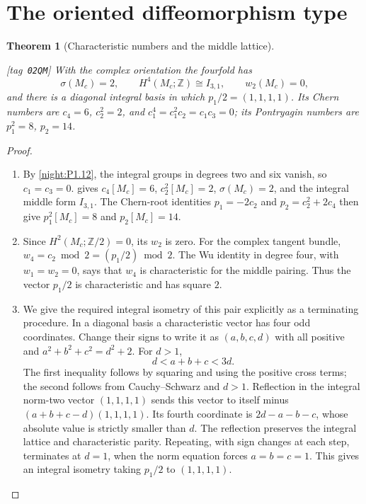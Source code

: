 \documentclass[11pt,a4paper]{article}
\numberwithin{equation}{section}
\newtheorem{theorem}{Theorem}[section]
\theoremstyle{definition}
\newcommand{\StatementRecord}[4]{{\upshape\footnotesize[tag~\texttt{#3}]}\enspace\ignorespaces}
\begin{document}
\section{The oriented diffeomorphism type}\label{pub:V:sec-diffeomorphism}

\begin{theorem}[Characteristic numbers and the middle lattice]\hypertarget{tag-02QM}{}\label{night:P1.13}
\StatementRecord{night:P1.13}{proved}{02QM}{\cref{night:P1.12}, \cref{sec:V-known-inputs}}
With the complex orientation the fourfold has
\[
\sigma(M_c)=2,\qquad H^4(M_c;\mathbb Z)\cong I_{3,1},\qquad
w_2(M_c)=0,
\]
and there is a diagonal integral basis in which
$p_1/2=(1,1,1,1)$.
Its Chern numbers are
$c_4=6$, $c_2^2=2$, and
$c_1^4=c_1^2c_2=c_1c_3=0$; its Pontryagin numbers are
$p_1^2=8$, $p_2=14$.
\end{theorem}
\begin{proof}
\begin{enumerate}[label=\arabic*.]
\item By \cref{night:P1.12}, the integral groups in degrees two
and six vanish, so $c_1=c_3=0$.
 gives
$c_4[M_c]=6$, $c_2^2[M_c]=2$, $\sigma(M_c)=2$, and the
integral middle form $I_{3,1}$.
The Chern-root identities
$p_1=-2c_2$ and $p_2=c_2^2+2c_4$ then give
$p_1^2[M_c]=8$ and $p_2[M_c]=14$.

\item Since $H^2(M_c;\mathbb Z/2)=0$, its $w_2$ is zero.
For the complex tangent bundle,
$w_4=c_2\bmod2=(p_1/2)\bmod2$.
The Wu identity in degree four, with $w_1=w_2=0$, says that $w_4$ is
characteristic for the middle pairing.  Thus the vector $p_1/2$ is
characteristic and has square $2$.

\item We give the required integral isometry of this pair explicitly as
a terminating procedure.  In a diagonal basis a characteristic vector
has four odd coordinates.  Change their signs to write it as
$(a,b,c,d)$ with all positive and
$a^2+b^2+c^2=d^2+2$.
For $d>1$,
\[
d<a+b+c<3d.
\]
The first inequality follows by squaring and using the positive cross
terms; the second follows from Cauchy--Schwarz and $d>1$.
Reflection in the integral norm-two vector $(1,1,1,1)$ sends this
vector to itself minus $(a+b+c-d)(1,1,1,1)$.
Its fourth coordinate is $2d-a-b-c$, whose absolute value is strictly
smaller than $d$.  The reflection preserves the integral lattice and
characteristic parity.  Repeating, with sign changes at each step,
terminates at $d=1$, when the norm equation forces $a=b=c=1$.
This gives an integral isometry taking $p_1/2$ to $(1,1,1,1)$.

\end{enumerate}
\end{proof}
\end{document}
